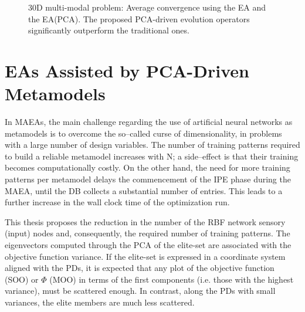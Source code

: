 \begin{figure}[h!]
\begin{minipage}[b]{1\linewidth}
 \centering
\end{minipage}
\caption{30D multi-modal problem: Average convergence using the EA and the EA(PCA). The proposed PCA-driven evolution operators significantly outperform the traditional ones.} 
\label{mmt3}
\end{figure}


\FloatBarrier
\section{EAs Assisted by PCA-Driven Metamodels}
In MAEAs, the main challenge regarding the use of artificial neural networks as metamodels is to overcome the so--called curse of dimensionality, in problems with a large number of design variables. 
The number of training patterns required to build a reliable metamodel increases with N; a side--effect is that their training becomes computationally costly. On the other hand, the need for more training patterns per metamodel delays the commencement of the IPE phase during the MAEA, until the DB collects a substantial number of entries. This leads to a further increase in the wall clock time of the optimization run.

This thesis proposes the reduction in the number of the RBF network sensory (input) nodes and, consequently, the required number of training patterns. The eigenvectors computed through the PCA of the elite-set are associated with the objective function variance. 
If the elite-set is expressed in a coordinate system aligned with the PDs, it is expected that any plot of the objective function (SOO) or $\Phi$ (MOO) in terms of the first components (i.e. those with the highest variance), must be scattered enough. In contrast, along the PDs with small variances, the elite members are much less scattered. 

